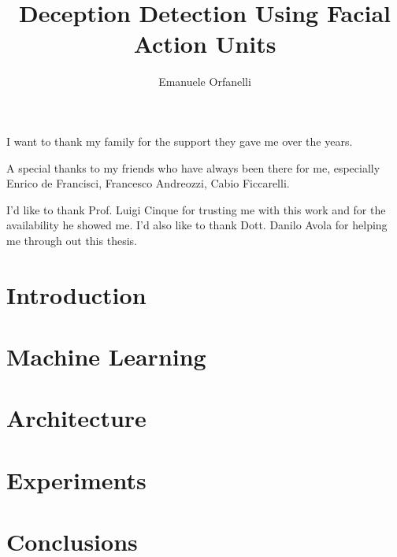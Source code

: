 \documentclass[LaM,binding=0.6cm,english,noexaminfo]{sapthesis}
\title{Deception Detection Using Facial Action Units}
\author{Emanuele Orfanelli}
\begin{document}
\frontmatter

\maketitle

\dedication{Dedicated to\\ my Family and Friends}

\begin{acknowledgments}
I want to thank my family for the support they gave me over the years.

A special thanks to my friends who have always been there for me, especially Enrico de Francisci, Francesco Andreozzi, Cabio Ficcarelli.

I'd like to thank Prof. Luigi Cinque for trusting me with this work and for the availability he showed me. I'd also like to thank Dott. Danilo Avola for helping me through out this thesis. 

\end{acknowledgments}

\tableofcontents



\mainmatter

\chapter{Introduction}


\chapter{Machine Learning} \label{tit:ml}


\chapter{Architecture} \label{tit:archi}


\chapter{Experiments} \label{tit:exp}


\chapter{Conclusions}  \label{tit:concl}


\backmatter

\printbibliography

\listoffigures

\cleardoublepage
\end{document}
